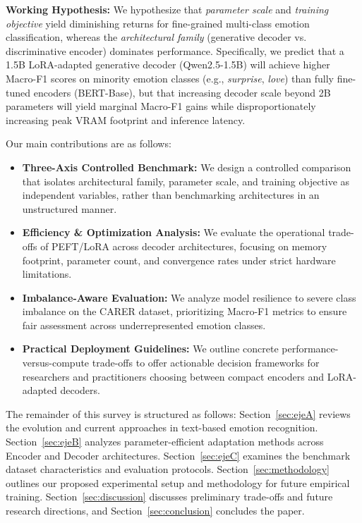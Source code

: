 \documentclass[conference]{IEEEtran}
\begin{document}
\textbf{Working Hypothesis:} We hypothesize that \textit{parameter scale} and \textit{training objective} yield diminishing returns for 
fine-grained multi-class emotion classification, whereas the \textit{architectural family} (generative decoder vs. discriminative encoder) 
dominates performance. Specifically, we predict that a 1.5B LoRA-adapted generative decoder (Qwen2.5-1.5B) will achieve higher Macro-F1 scores 
on minority emotion classes (e.g., \textit{surprise}, \textit{love}) than fully fine-tuned encoders (BERT-Base), but that increasing decoder scale 
beyond 2B parameters will yield marginal Macro-F1 gains while disproportionately increasing peak VRAM footprint and inference latency.

Our main contributions are as follows:
\begin{itemize}
    \item \textbf{Three-Axis Controlled Benchmark:} We design a controlled comparison that isolates architectural family, parameter scale, and training objective as independent variables, rather than benchmarking architectures in an unstructured manner.
    \item \textbf{Efficiency \& Optimization Analysis:} We evaluate the operational trade-offs of PEFT/LoRA across decoder architectures, focusing on memory footprint, parameter count, and convergence rates under strict hardware limitations.
    \item \textbf{Imbalance-Aware Evaluation:} We analyze model resilience to severe class imbalance on the CARER dataset, prioritizing Macro-F1 metrics to ensure fair assessment across underrepresented emotion classes.
    \item \textbf{Practical Deployment Guidelines:} We outline concrete performance-versus-compute trade-offs to offer actionable decision frameworks for researchers and practitioners choosing between compact encoders and LoRA-adapted decoders.
\end{itemize}

The remainder of this survey is structured as follows: Section~\ref{sec:ejeA} reviews the evolution and current approaches in text-based emotion recognition. Section~\ref{sec:ejeB} analyzes parameter-efficient adaptation methods across Encoder and Decoder architectures. Section~\ref{sec:ejeC} examines the benchmark dataset characteristics and evaluation protocols. Section~\ref{sec:methodology} outlines our proposed experimental setup and methodology for future empirical training. Section~\ref{sec:discussion} discusses preliminary trade-offs and future research directions, and Section~\ref{sec:conclusion} concludes the paper.
\end{document}
